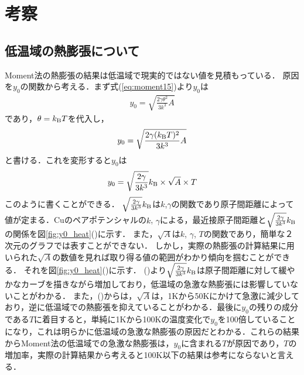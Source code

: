 \chapter{考察}
\section{低温域の熱膨張について}
\label{sec:he_100k}
Moment法の熱膨張の結果は低温域で現実的ではない値を見積もっている．
原因を$y_0$の関数から考える．まず式(\ref{eq:moment15})より$y_0$は
\begin{eqnarray}
\label{eq:y01}
y_0= \sqrt{\frac{2\gamma\theta^2}{3k^3}A}
\end{eqnarray}
であり，$\theta=k_{\rm{B}}T$を代入し，
\begin{eqnarray}
\label{eq:y02}
y_0= \sqrt{\frac{2\gamma(k_{\rm{B}}T)^2}{3k^3}A}
\end{eqnarray}
と書ける．これを変形すると$y_0$は
\begin{eqnarray}
\label{eq:y02}
y_0= \sqrt{\frac{2\gamma}{3k^3}}k_{\rm{B}}\times \sqrt{A} \times T
\end{eqnarray}
このように書くことができる．
$\sqrt{\frac{2\gamma}{3k^3}}k_{\rm{B}}$は$k$,$\gamma$の関数であり原子間距離によって値が定まる．Cuのペアポテンシャルの$k$, $\gamma$による，最近接原子間距離と$\sqrt{\frac{2\gamma}{3k^3}}k_{\rm{B}}$の関係を図\ref{fig:y0_heat}()に示す．
また，$\sqrt{A}$は$k$, $\gamma$, $T$の関数であり，簡単な２次元のグラフでは表すことができない．
しかし，実際の熱膨張の計算結果に用いられた$\sqrt{A}$の数値を見れば取り得る値の範囲がわかり傾向を掴むことができる．
それを図\ref{fig:y0_heat}()に示す．
()より$\sqrt{\frac{2\gamma}{3k^3}}k_{\rm{B}}$は原子間距離に対して緩やかなカーブを描きながら増加しており，低温域の急激な熱膨張には影響していないことがわかる．
また，()からは，$\sqrt{A}$は，1Kから50Kにかけて急激に減少しており，逆に低温域での熱膨張を抑えていることがわかる．最後に$y_0$の残りの成分である$T$に着目すると，単純に1Kから100Kの温度変化で$y_0$を100倍していることになり，これは明らかに低温域の急激な熱膨張の原因だとわかる．これらの結果からMoment法の低温域での急激な熱膨張は，$y_0$に含まれる$T$が原因であり，$T$の増加率，実際の計算結果から考えると100K以下の結果は参考にならないと言える．
